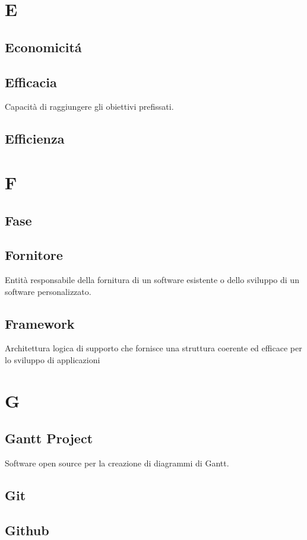 \documentclass[12pt]{article}
\begin{document}
	\clearpage
	\section{E}
		\subsection{Economicit\'a}
		\subsection{Efficacia}
		Capacità di raggiungere gli obiettivi prefissati.
		\subsection{Efficienza}
	\clearpage
	\section{F}
		\subsection{Fase}

		\subsection{Fornitore}
		Entità responsabile della fornitura di un software esistente o dello sviluppo di un software personalizzato.
		\subsection{Framework} %
		Architettura logica di supporto che fornisce una struttura coerente ed efficace per lo sviluppo di applicazioni

	\clearpage
	\section{G}
		\subsection{Gantt Project}
		 Software open source per la creazione di diagrammi di Gantt.
		\subsection{Git}


		\subsection{Github}
	\clearpage
\end{document}
